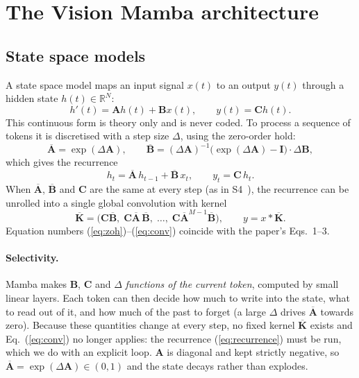 \documentclass[11pt,a4paper]{article}
\begin{document}
\section{The Vision Mamba architecture}

\subsection{State space models}
A state space model maps an input signal $x(t)$ to an output $y(t)$ through a hidden
state $h(t)\in\mathbb{R}^N$:
\[
  h'(t) = \mathbf{A}h(t) + \mathbf{B}x(t), \qquad y(t) = \mathbf{C}h(t).
\]
This continuous form is theory only and is never coded. To process a sequence of
tokens it is discretised with a step size $\Delta$, using the zero-order hold:
\begin{equation}
  \overline{\mathbf{A}} = \exp(\Delta\mathbf{A}), \qquad
  \overline{\mathbf{B}} = (\Delta\mathbf{A})^{-1}\bigl(\exp(\Delta\mathbf{A})-\mathbf{I}\bigr)
                          \cdot \Delta\mathbf{B},
  \label{eq:zoh}
\end{equation}
which gives the recurrence
\begin{equation}
  h_t = \overline{\mathbf{A}}\,h_{t-1} + \overline{\mathbf{B}}\,x_t, \qquad
  y_t = \mathbf{C}\,h_t .
  \label{eq:recurrence}
\end{equation}
When $\overline{\mathbf{A}}$, $\overline{\mathbf{B}}$ and $\mathbf{C}$ are the same at
every step (as in S4~\cite{gu2022s4}), the recurrence can be unrolled into a single
global convolution with kernel
\begin{equation}
  \overline{\mathbf{K}} = \bigl(\mathbf{C}\overline{\mathbf{B}},\;
     \mathbf{C}\overline{\mathbf{A}}\,\overline{\mathbf{B}},\; \dots,\;
     \mathbf{C}\overline{\mathbf{A}}^{M-1}\overline{\mathbf{B}}\bigr),
  \qquad y = x * \overline{\mathbf{K}} .
  \label{eq:conv}
\end{equation}
Equation numbers (\ref{eq:zoh})--(\ref{eq:conv}) coincide with the paper's
Eqs.~1--3.

\paragraph{Selectivity.} Mamba makes $\mathbf{B}$, $\mathbf{C}$ and $\Delta$
\emph{functions of the current token}, computed by small linear layers. Each token
can then decide how much to write into the state, what to read out of it, and how
much of the past to forget (a large $\Delta$ drives $\overline{\mathbf{A}}$ towards
zero). Because these quantities change at every step, no fixed kernel
$\overline{\mathbf{K}}$ exists and Eq.~(\ref{eq:conv}) no longer applies: the
recurrence (\ref{eq:recurrence}) must be run, which we do with an explicit loop.
$\mathbf{A}$ is diagonal and kept strictly negative, so
$\overline{\mathbf{A}}=\exp(\Delta\mathbf{A})\in(0,1)$ and the state decays rather
than explodes.
\end{document}
